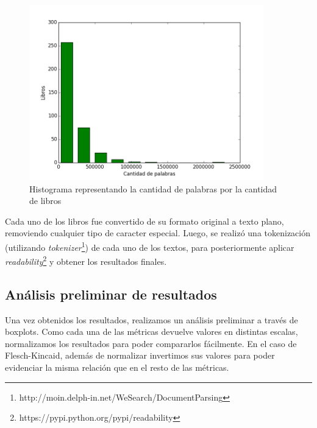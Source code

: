 \documentclass[12pt,journal,compsoc]{IEEEtran}
\begin{document}
\begin{figure}[H]
\begin{center}
  \includegraphics[width=4.0in]{../unigrams/scripts/histogram/histogramaDePalabras.png}
  \caption{Histograma representando la cantidad de palabras por la cantidad de libros}
  \end{center}
\end{figure}

Cada uno de los libros fue convertido de su formato original a texto plano, removiendo cualquier tipo de caracter especial. Luego, se realizó una tokenización (utilizando \textit{tokenizer}\footnote{http://moin.delph-in.net/WeSearch/DocumentParsing}) de cada uno de los textos, para posteriormente aplicar \textit{readability}\footnote{https://pypi.python.org/pypi/readability} y obtener los resultados finales.

\subsection{Análisis preliminar de resultados}

Una vez obtenidos los resultados, realizamos un análisis preliminar a través de boxplots. Como cada una de las métricas devuelve valores en distintas escalas, normalizamos los resultados para poder compararlos fácilmente. En el caso de Flesch-Kincaid, además de normalizar invertimos sus valores para poder evidenciar la misma relación que en el resto de las métricas.
\end{document}
